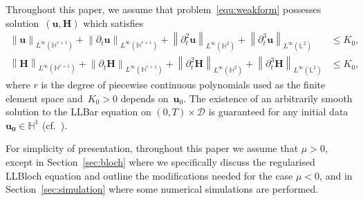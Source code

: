 \documentclass[11pt, reqno]{amsart}
\theoremstyle{definition}
\theoremstyle{remark}
\numberwithin{equation}{section}
\newcommand{\bff}{\boldsymbol}
\newcommand{\bb}{\mathbb}
\newcommand{\norm}[2]{\left\|{#1}\right\|_{#2}}
\newcommand{\inpro}[2]{\left\langle#1,#2\right\rangle}
\begin{document}

Throughout this paper, we assume that problem~\eqref{equ:weakform} possesses
solution~$(\bff{u}, \bff{H})$ which satisfies
\begin{equation}\label{equ:ass 2 u}
\begin{aligned}
	\norm{\bff{u}}{L^\infty(\bb{H}^{r+1})}
	+ \norm{\partial_t \bff{u}}{L^\infty(\bb{H}^{r+1})}
	+ \norm{\partial_t^2 \bff{u}}{L^\infty(\bb{H}^2)}
	+ \norm{\partial_t^3 \bff{u}}{L^\infty(\bb{L}^2)}
	&\le K_0,
	\\
	\norm{\bff{H}}{L^\infty(\bb{H}^{r+1})}
	+ \norm{\partial_t \bff{H}}{L^\infty(\bb{H}^{r+1})}
	+ \norm{\partial_t^2 \bff{H}}{L^\infty(\bb{H}^2)}
	+ \norm{\partial_t^3 \bff{H}}{L^\infty(\bb{L}^2)}
	&\le K_0,
\end{aligned}
\end{equation}
where $r$ is the degree of piecewise continuous polynomials used as the finite element space and~$K_0>0$ depends on~$\bff{u}_0$. The existence of an arbitrarily smooth solution to the LLBar equation on $(0,T)\times\mathscr{D}$ is guaranteed for any initial data $\bff{u_0}\in\bb{H}^1$ (cf.~\cite{GolSoeTra24a}).

For simplicity of presentation, throughout this paper we assume that $\mu>0$, except in Section~\ref{sec:bloch} where we specifically discuss the regularised LLBloch equation and outline the modifications needed for the case $\mu<0$, and in Section~\ref{sec:simulation} where some numerical simulations are performed.
\end{document}
